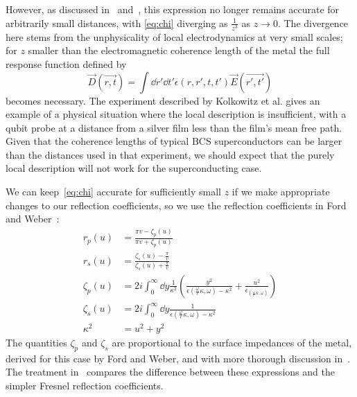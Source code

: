 \documentclass{article}
\begin{document}
However, as discussed in~\cite{QubitRelax} and~\cite{Henkel2006}, this expression no longer remains accurate for arbitrarily small distances, with \eqref{eq:chi} diverging as $\frac{1}{z^3}$ as $z \rightarrow 0$.
The divergence here stems from the unphysicality of local electrodynamics at very small scales;
for $z$ smaller than the electromagnetic coherence length of the metal the full response function defined by
\begin{equation}
	\vec{D}(\vec{r, t}) = \int \dd{r'} \dd{t'} \epsilon(r, r', t, t') \vec{E}(\vec{r', t'})
\end{equation}
becomes necessary.
The experiment described by Kolkowitz et al.\cite{Kolkowitz2015} gives an example of a physical situation where the local description is insufficient, with a qubit probe at a distance from a silver film less than the film's mean free path.
Given that the coherence lengths of typical BCS superconductors can be larger than the distances used in that experiment, we should expect that the purely local description will not work for the superconducting case.

We can keep~\eqref{eq:chi} accurate for sufficiently small $z$ if we make appropriate changes to our reflection coefficients\cite{QubitRelax,Henkel2006}, so we use the reflection coefficients in Ford and Weber~\cite{Ford1984}:
\begin{align}
	r_p(u) &= \frac{\pi v - \zeta_p(u)}{\pi v + \zeta_p(u)} \\
	r_s(u) &= \frac{\zeta_s(u) - \frac{\pi}{v}}{\zeta_s(u) + \frac{\pi}{v}} \\
	\zeta_p(u) &= 2i \int_0^\infty \dd{y} \frac{1}{\kappa^2} \left( \frac{y^2}{\epsilon(\frac{\omega}{c}\kappa, \omega) - \kappa^2} + \frac{u^2}{\epsilon_(\frac{\omega}{c}\kappa, \omega)} \right) \label{eq:zp} \\
	\zeta_s(u) &= 2i \int_0^\infty \dd{y} \frac{1}{\epsilon(\frac{\omega}{c}\kappa, \omega) - \kappa^2} \label{eq:zs} \\
	\kappa^2 &= u^2 + y^2
\end{align}
The quantities $\zeta_p$ and $\zeta_s$ are proportional to the surface impedances of the metal, derived for this case by Ford and Weber\cite{Ford1984}, and with more thorough discussion in~\cite{LandauLifshitzElectrodynamics}.
The treatment in~\cite{QubitRelax} compares the difference between these expressions and the simpler Fresnel reflection coefficients.
\end{document}
